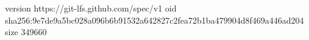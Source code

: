 version https://git-lfs.github.com/spec/v1
oid sha256:9e7de9a5bc028a096b6b91532a642827c2fea72b1ba479904d8f469a446ad204
size 349660
